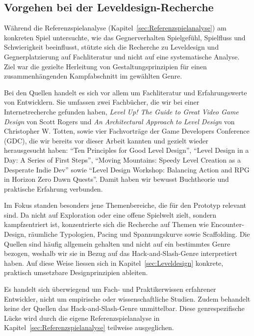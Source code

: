 \documentclass[../Main.tex]{subfiles}
\begin{document}
\subsection{Vorgehen bei der Leveldesign-Recherche} \label{sec:VorgehenLeveldesign}
Während die Referenzspielanalyse (Kapitel~\ref{sec:Referenzspielanalyse}) am konkreten Spiel untersuchte, wie das Gegnerverhalten Spielgefühl, Spielfluss und Schwierigkeit beeinflusst, stützte sich die Recherche zu Leveldesign und Gegnerplatzierung auf Fachliteratur und nicht auf eine systematische Analyse. Ziel war die gezielte Herleitung von Gestaltungsprinzipien für einen zusammenhängenden Kampfabschnitt im gewählten Genre.

Bei den Quellen handelt es sich vor allem um Fachliteratur und Erfahrungswerte von Entwicklern. Sie umfassen zwei Fachbücher, die wir bei einer Internetrecherche gefunden haben, \textit{Level Up! The Guide to Great Video Game Design} von Scott Rogers\autocite{rogers2014levelup} und \textit{An Architectural Approach to Level Design} von Christopher W. Totten\autocite{totten2014architectural}, sowie vier Fachvorträge der Game Developers Conference (GDC), die wir bereits vor dieser Arbeit kannten und gezielt wieder herausgesucht haben: \enquote{Ten Principles for Good Level Design}\autocite{gdc_tenprinciples2010}, \enquote{Level Design in a Day: A Series of First Steps}\autocite{gdc_leveldesignaday2020}, \enquote{Moving Mountains: Speedy Level Creation as a Desperate Indie Dev}\autocite{gdc_movingmountains2020} sowie \enquote{Level Design Workshop: Balancing Action and RPG in Horizon Zero Dawn Quests}\autocite{gdc_horizonquests2018}. Damit haben wir bewusst Buchtheorie und praktische Erfahrung verbunden.

Im Fokus standen besonders jene Themenbereiche, die für den Prototyp relevant sind. Da  nicht auf Exploration oder eine offene Spielwelt zielt, sondern kampfzentriert ist, konzentrierte sich die Recherche auf Themen wie Encounter-Design, räumliche Typologien, Pacing und Spannungskurve sowie Scaffolding. Die Quellen sind häufig allgemein gehalten und nicht auf ein bestimmtes Genre bezogen, weshalb wir sie in Bezug auf das Hack-and-Slash-Genre interpretiert haben. Auf diese Weise liessen sich in Kapitel~\ref{sec:Leveldesign} konkrete, praktisch umsetzbare Designprinzipien ableiten.

Es handelt sich überwiegend um Fach- und Praktikerwissen erfahrener Entwickler, nicht um empirische oder wissenschaftliche Studien. Zudem behandelt keine der Quellen das Hack-and-Slash-Genre unmittelbar. Diese genrespezifische Lücke wird durch die eigene Referenzspielanalyse in Kapitel~\ref{sec:Referenzspielanalyse} teilweise ausgeglichen.
\end{document}
